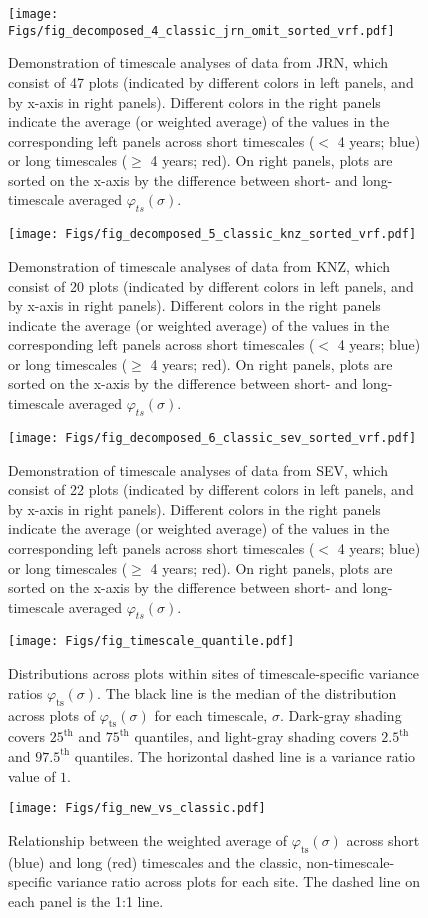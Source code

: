 \documentclass[letterpaper,11pt]{article}
\begin{document}
\begin{figure}
\texttt{[image: Figs/fig\_decomposed\_4\_classic\_jrn\_omit\_sorted\_vrf.pdf]}
\caption{Demonstration of timescale analyses of data from JRN, which consist of 47 plots (indicated by different colors in left panels, and by x-axis in right panels). Different colors in the right panels indicate the average (or weighted average) of the values in the corresponding left panels across short timescales ($<$ 4 years; blue) or long timescales ($\geq$ 4 years; red). On right panels, plots are sorted on the x-axis by the difference between short- and long-timescale averaged $\varphi _{ts} (\sigma)$.}
\end{figure}

\begin{figure}
\texttt{[image: Figs/fig\_decomposed\_5\_classic\_knz\_sorted\_vrf.pdf]}
\caption{Demonstration of timescale analyses of data from KNZ, which consist of 20 plots (indicated by different colors in left panels, and by x-axis in right panels). Different colors in the right panels indicate the average (or weighted average) of the values in the corresponding left panels across short timescales ($<$ 4 years; blue) or long timescales ($\geq$ 4 years; red). On right panels, plots are sorted on the x-axis by the difference between short- and long-timescale averaged $\varphi _{ts} (\sigma)$.}
\end{figure}

\begin{figure}
\texttt{[image: Figs/fig\_decomposed\_6\_classic\_sev\_sorted\_vrf.pdf]}
\caption{Demonstration of timescale analyses of data from SEV, which consist of 22 plots (indicated by different colors in left panels, and by x-axis in right panels). Different colors in the right panels indicate the average (or weighted average) of the values in the corresponding left panels across short timescales ($<$ 4 years; blue) or long timescales ($\geq$ 4 years; red). On right panels, plots are sorted on the x-axis by the difference between short- and long-timescale averaged $\varphi _{ts} (\sigma)$.}
\end{figure}

\begin{figure}
\texttt{[image: Figs/fig\_timescale\_quantile.pdf]}
\caption{Distributions across plots within sites of timescale-specific variance ratios
$\varphi_{\text{ts}}(\sigma)$. The black line is the median of the distribution
across plots of $\varphi_{\text{ts}}(\sigma)$ for each timescale, $\sigma$. Dark-gray
shading covers $25^{\text{th}}$ and $75^{\text{th}}$ quantiles, and light-gray 
shading covers $2.5^{\text{th}}$ and $97.5^{\text{th}}$ quantiles. The horizontal 
dashed line is a variance ratio value of $1$.}
\end{figure}

\begin{figure}
\texttt{[image: Figs/fig\_new\_vs\_classic.pdf]}
\caption{Relationship between the weighted average of $\varphi_{\text{ts}}(\sigma)$
across short (blue) and long (red) timescales and the classic, non-timescale-specific
variance ratio across plots for each site. The dashed line on each panel is the 1:1 
line.}
\end{figure}
\end{document}
